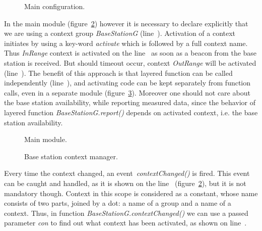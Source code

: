
\begin{figure}[!h]
\TheSbox
\caption{Main configuration.}
\label{fig:mc}
\end{figure}

In the main module (figure~\ref{fig:mm}) however it is necessary to declare
explicitly that we are using a context group \emph{BaseStationG}
(line~). Activation of a context initiates by using a key-word
\emph{activate} which is followed by a full context name. Thus
\emph{InRange} context is activated on the line~ as soon as a
beacon from the base station is received. But should timeout occur, context
\emph{OutRange} will be activated (line~). The benefit of
this approach is that layered function can be called independently
(line~), and activating code can be kept separately from function
calls, even in a separate module (figure~\ref{fig:bscm}).
Moreover one should not care about the base station availability, while
reporting measured data, since the behavior of layered function
\emph{BaseStationG.report()} depends on activated context, i.e. the base
station availability.


\begin{figure}[!h]
\TheSbox
\caption{Main module.}
\label{fig:mm}
\end{figure}


\begin{figure}[!h]
\TheSbox
\caption{Base station context manager.}
\label{fig:bscm}
\end{figure}

Every time the context changed, an event~\emph{contextChanged()} is fired. This event can be
caught and handled, as it is shown on the line~ (figure~\ref{fig:mm}),
but it is not mandatory though. Context in this scope is considered as a constant,
whose name consists of two parts, joined by a dot: a name of a group and a name
of a context. Thus, in function \emph{BaseStationG.contextChanged()} we can use
a passed parameter \emph{con} to find out what context has been activated, as
shown on line~.
